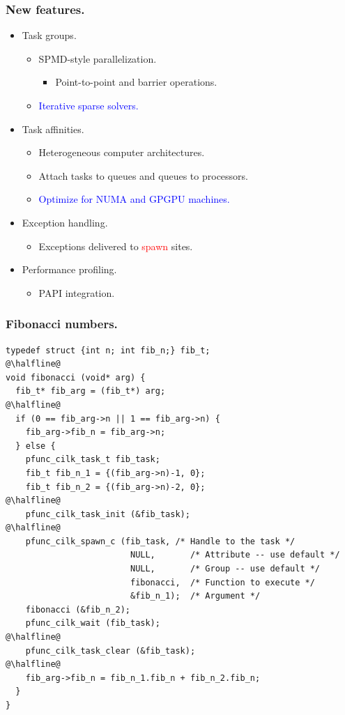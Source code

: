 \documentclass{beamer}
\begin{document}
\begin{frame}
\frametitle{New features.}
\begin{itemize}
\item Task groups.
  \begin{itemize}
  \item SPMD-style parallelization.
    \begin{itemize}
    \item Point-to-point and barrier operations.
    \end{itemize}
  \item \textcolor{blue}{Iterative sparse solvers.}
  \end{itemize}
\item Task affinities.
  \begin{itemize}
  \item Heterogeneous computer architectures.
  \item Attach tasks to queues and queues to processors.
  \item \textcolor{blue}{Optimize for NUMA and GPGPU machines.}
  \end{itemize}
\item Exception handling.
  \begin{itemize}
  \item Exceptions delivered to \textcolor{red}{spawn} sites.
  \end{itemize}
\item Performance profiling.
  \begin{itemize}
  \item PAPI integration.
  \end{itemize}
\end{itemize}
\end{frame}

\begin{frame}[fragile]
\frametitle{Fibonacci numbers.}
\begin{center}
\begin{minipage}{0.75\textwidth}
\begin{lstlisting}
typedef struct {int n; int fib_n;} fib_t;
@\halfline@
void fibonacci (void* arg) {
  fib_t* fib_arg = (fib_t*) arg;
@\halfline@
  if (0 == fib_arg->n || 1 == fib_arg->n) { 
    fib_arg->fib_n = fib_arg->n;
  } else { 
    pfunc_cilk_task_t fib_task;
    fib_t fib_n_1 = {(fib_arg->n)-1, 0};
    fib_t fib_n_2 = {(fib_arg->n)-2, 0};
@\halfline@
    pfunc_cilk_task_init (&fib_task);   
@\halfline@
    pfunc_cilk_spawn_c (fib_task, /* Handle to the task */
                         NULL,       /* Attribute -- use default */
                         NULL,       /* Group -- use default */
                         fibonacci,  /* Function to execute */ 
                         &fib_n_1);  /* Argument */
    fibonacci (&fib_n_2);
    pfunc_cilk_wait (fib_task);
@\halfline@
    pfunc_cilk_task_clear (&fib_task);   
@\halfline@
    fib_arg->fib_n = fib_n_1.fib_n + fib_n_2.fib_n;
  } 
}
\end{lstlisting}
\end{minipage}
\end{center}
\end{frame}
\end{document}
